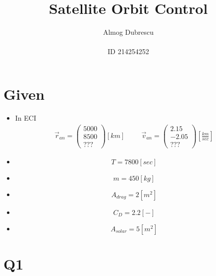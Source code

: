 \documentclass[11pt, a4paper]{article}
\title{Satellite Orbit Control}
\author{Almog Dubrescu\\\\ID 214254252}
\begin{document}
\maketitle

\thispagestyle{empty}
\newpage
\setcounter{page}{1}

\tableofcontents
\vfil
\listoffigures
\newpage

\section{Given}
\begin{itemize}
    \item In ECI
    \begin{align*}
        \vec{r}_{an} = \begin{pmatrix}
            5000\\8500\\???
        \end{pmatrix} [km]
        \hspace{1cm}
        \vec{v}_{an} = \begin{pmatrix}
            2.15\\-2.05\\???
        \end{pmatrix} \left[\frac{km}{sec}\right]
    \end{align*}
    \item $$ T = 7800 [sec] $$
    \item $$ m = 450 [kg] $$
    \item $$ A_{drag} = 2 [m^2]$$
    \item $$ C_D = 2.2 [-]$$
    \item $$ A_{solar} = 5 [m^2]$$
\end{itemize}
\section{Q1}

\newpage
\end{document}
